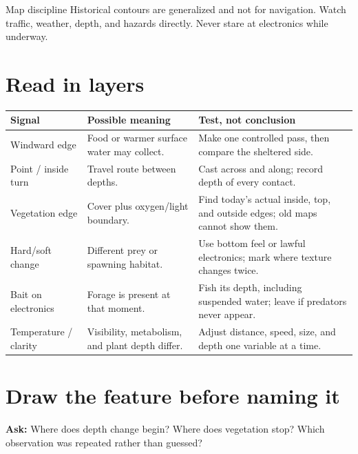 
\begin{teloshazard}{Map discipline}
Historical contours are generalized and not for navigation. Watch traffic,
weather, depth, and hazards directly. Never stare at electronics while
underway.
\end{teloshazard}

\section{Read in layers}
\begin{longtable}{@{}p{.17\linewidth}p{.29\linewidth}p{.46\linewidth}@{}}
\toprule\textbf{Signal}&\textbf{Possible meaning}&\textbf{Test, not conclusion}\\\midrule
Windward edge&Food or warmer surface water may collect.&Make one controlled
pass, then compare the sheltered side.\\
Point / inside turn&Travel route between depths.&Cast across and along; record
depth of every contact.\\
Vegetation edge&Cover plus oxygen/light boundary.&Find today's actual inside,
top, and outside edges; old maps cannot show them.\\
Hard/soft change&Different prey or spawning habitat.&Use bottom feel or lawful
electronics; mark where texture changes twice.\\
Bait on electronics&Forage is present at that moment.&Fish its depth, including
suspended water; leave if predators never appear.\\
Temperature / clarity&Visibility, metabolism, and plant depth differ.&Adjust
distance, speed, size, and depth one variable at a time.\\
\bottomrule
\end{longtable}

\section{Draw the feature before naming it}
\begin{center}
\end{center}
\textbf{Ask:} Where does depth change begin? Where does vegetation stop? Which
observation was repeated rather than guessed?

